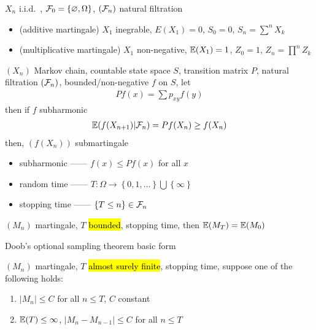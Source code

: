 \begin{example}
    $X_n$ i.i.d.\ , $\mathcal{F}_0 = \left\{ \varnothing, \Omega \right\}$, $(\mathcal{F}_n)$ natural filtration
    \begin{itemize}
        \item (additive martingale) $X_1$ inegrable, $E(X_1) = 0$, $S_0 = 0$, $S_n = \sum^n X_k$
        \item (multiplicative martingale) $X_1$ non-negative, $\mathbb{E}(X_1) = 1$, $Z_0 = 1$, $Z_n = \prod^n Z_k$
    \end{itemize}
\end{example}

\begin{example}
    $(X_n)$ Markov chain, countable state space $S$, transition matrix $P$, natural filtration $(\mathcal{F}_n)$, bounded/non-negative $f$ on $S$, let
    \begin{align*}
        Pf(x) = \sum p_{xy} f(y)
    \end{align*}
    then if $f$ subharmonic
    \begin{align*}
        \mathbb{E}(f(X_{n+1})|\mathcal{F}_n) = Pf(X_n) \geq f(X_n)
    \end{align*}
    then, $(f(X_n))$ submartingale
\end{example}

\begin{itemize}
    \item subharmonic ------ $f(x) \leq Pf(x)$ for all $x$
    \item random time ------ $T:\Omega \rightarrow \left\{ 0, 1, \dots \right\} \bigcup \left\{ \infty \right\}$
    \item stopping time ------ $\left\{ T \leq n \right\} \in \mathcal{F}_n$
\end{itemize}

\begin{thm}
    $(M_n)$ martingale, $T$ \hl{bounded}, stopping time, then $\mathbb{E}(M_T) = \mathbb{E}(M_0)$
\end{thm}

\begin{fact}
    Doob's optional sampling theorem basic form
\end{fact}

\begin{thm}
    $(M_n)$ martingale, $T$ \hl{almost surely finite}, stopping time, suppose one of the following holds:
    \begin{enumerate}
        \item $|M_n| \leq C$ for all $n \leq T$, $C$ constant
        \item $\mathbb{E}(T) \leq \infty$, $|M_n - M_{n-1}| \leq C$ for all $n \leq T$
    \end{enumerate}
\end{thm}

